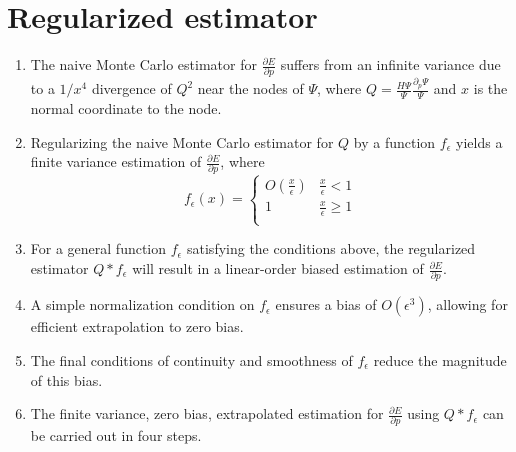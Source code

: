 \documentclass{article}
\begin{document}
\section{Regularized estimator}
\begin{enumerate}
\item The naive Monte Carlo estimator for $\frac{\partial E}{\partial p}$ suffers from an infinite variance due to a $1/x^4$ divergence of $Q^2$ near the nodes of $\Psi$, where $Q = \frac{H\Psi}{\Psi}\frac{\partial_p \Psi}{\Psi}$ and $x$ is the normal coordinate to the node.

\item Regularizing the naive Monte Carlo estimator for $Q$ by a function $f_\epsilon$ yields a finite variance estimation of $\frac{\partial E}{\partial p}$, where 
\[ f_\epsilon(x) = \begin{cases} 
      O(\frac{x}{\epsilon}) & \frac{x}{\epsilon} < 1 \\
      1 & \frac{x}{\epsilon} \ge 1 \\
   \end{cases}
\]

\item For a general function $f_\epsilon$ satisfying the conditions above, the regularized estimator $Q * f_\epsilon$ will result in a linear-order biased estimation of $\frac{\partial E}{\partial p}$.

\item A simple normalization condition on $f_\epsilon$ ensures a bias of $O(\epsilon^3)$, allowing for efficient extrapolation to zero bias.

\item The final conditions of continuity and smoothness of $f_\epsilon$ reduce the magnitude of this bias.

\item The finite variance, zero bias, extrapolated estimation for $\frac{\partial E}{\partial p}$ using $Q * f_\epsilon$ can be carried out in four steps.

\end{enumerate}
\end{document}
